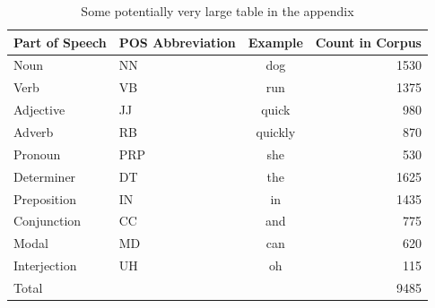 \documentclass[../CLthesis.tex]{subfiles}
\begin{document}
\begin{table}[htbp]
	\centering
	\begin{tabular}{llcr}
		\toprule
		Part of Speech & POS Abbreviation & Example & Count in Corpus \\
		\midrule
		Noun           & NN               & dog     & 1530           \\
		Verb           & VB               & run     & 1375           \\
		Adjective      & JJ               & quick   & 980            \\
		Adverb         & RB               & quickly & 870            \\
		Pronoun        & PRP              & she     & 530            \\
		Determiner     & DT               & the     & 1625           \\
		Preposition    & IN               & in      & 1435           \\
		Conjunction    & CC               & and     & 775            \\
		Modal          & MD               & can     & 620            \\
		Interjection   & UH               & oh      & 115            \\
		\midrule
		Total          &                  &         & 9485           \\
		\bottomrule
	\end{tabular}
	

	\caption[An Additional Table]{Some potentially very large table in the appendix}%
	\label{tab:appendix_postags2}
\end{table}
\end{document}
